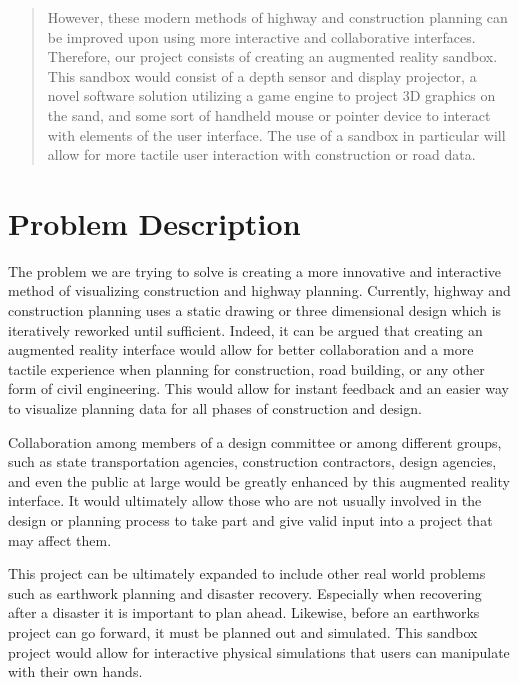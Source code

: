 \documentclass[onecolumn, draftclsnofoot,10pt, compsoc]{IEEEtran}
\begin{document}
\begin{titlepage}
\begin{singlespace}
\begin{abstract}
			However, these modern methods of highway and construction planning can be improved upon using more interactive and collaborative interfaces.
			Therefore, our project consists of creating an augmented reality sandbox.
			This sandbox would consist of a depth sensor and display projector, a novel software solution utilizing a game engine to project 3D graphics on the sand, and some sort of handheld mouse or pointer device to interact with elements of the user interface.
			The use of a sandbox in particular will allow for more tactile user interaction with construction or road data.
        \end{abstract}     
    \end{singlespace}
\end{titlepage}
\newpage
{}
\tableofcontents
\clearpage

\section{Problem Description}
The problem we are trying to solve is creating a more innovative and interactive method of visualizing construction and highway planning.
Currently, highway and construction planning uses a static drawing or three dimensional design which is iteratively reworked until sufficient.
Indeed, it can be argued that creating an augmented reality interface would allow for better collaboration and a more tactile experience when planning for construction, road building, or any other form of civil engineering.
This would allow for instant feedback and an easier way to visualize planning data for all phases of construction and design.
\par
Collaboration among members of a design committee or among different groups, such as state transportation agencies, construction contractors, design agencies, and even the public at large would be greatly enhanced by this augmented reality interface.
It would ultimately allow those who are not usually involved in the design or planning process to take part and give valid input into a project that may affect them.
\par
This project can be ultimately expanded to include other real world  problems such as earthwork planning and disaster recovery.
Especially when recovering after a disaster it is important to plan ahead. Likewise, before an earthworks project can go forward, it must be planned out and simulated.
This sandbox project would allow for interactive physical simulations that users can manipulate with their own hands.
\end{document}
